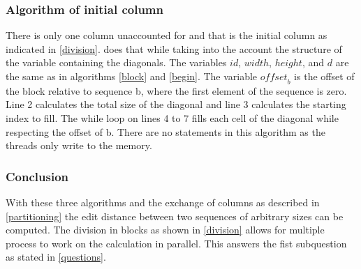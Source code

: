 \subsubsection{Algorithm of initial column}
There is only one column unaccounted for and that is the initial column as indicated in \cref{division}.
 does that while taking into the account the structure of the variable containing the diagonals.
The variables $id$, $width$, $height$, and $d$ are the same as in algorithms \ref{block} and \ref{begin}.
The variable $\mathit{offset}_b$ is the offset of the block relative to sequence b, where the first element of the sequence is zero.
Line 2 calculates the total size of the diagonal and line 3 calculates the starting index to fill.
The while loop on lines 4 to 7 fills each cell of the diagonal while respecting the offset of b.
There are no  statements in this algorithm as the threads only write to the memory.

\subsubsection{Conclusion}
With these three algorithms and the exchange of columns as described in \cref{partitioning} the edit distance between two sequences of arbitrary sizes can be computed.
The division in blocks as shown in \cref{division} allows for multiple process to work on the calculation in parallel.
This answers the fist subquestion as stated in \cref{questions}.

